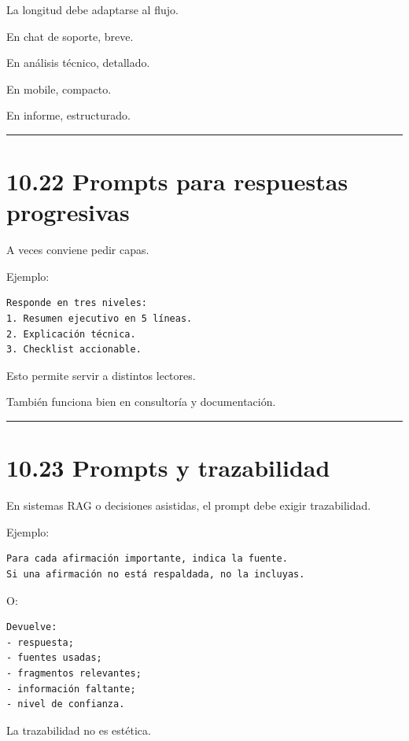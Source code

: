 La longitud debe adaptarse al flujo.

En chat de soporte, breve.

En análisis técnico, detallado.

En mobile, compacto.

En informe, estructurado.

\begin{center}\rule{0.5\linewidth}{0.5pt}\end{center}

\section{10.22 Prompts para respuestas
progresivas}\label{prompts-para-respuestas-progresivas}

A veces conviene pedir capas.

Ejemplo:

\begin{lstlisting}
Responde en tres niveles:
1. Resumen ejecutivo en 5 líneas.
2. Explicación técnica.
3. Checklist accionable.
\end{lstlisting}

Esto permite servir a distintos lectores.

También funciona bien en consultoría y documentación.

\begin{center}\rule{0.5\linewidth}{0.5pt}\end{center}

\section{10.23 Prompts y trazabilidad}\label{prompts-y-trazabilidad}

En sistemas RAG o decisiones asistidas, el prompt debe exigir
trazabilidad.

Ejemplo:

\begin{lstlisting}
Para cada afirmación importante, indica la fuente.
Si una afirmación no está respaldada, no la incluyas.
\end{lstlisting}

O:

\begin{lstlisting}
Devuelve:
- respuesta;
- fuentes usadas;
- fragmentos relevantes;
- información faltante;
- nivel de confianza.
\end{lstlisting}

La trazabilidad no es estética.

